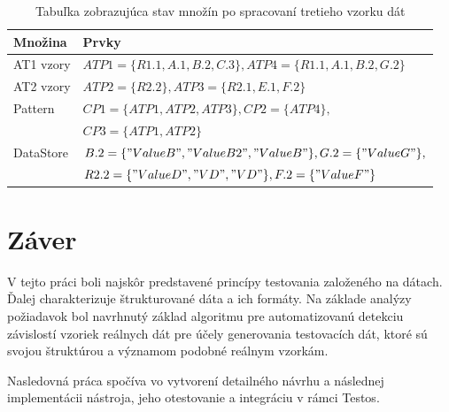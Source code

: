 \begin{table}[hbt]
	\centering
	\label{alg_example3_tab}
	\begin{tabular}{|p{1.8cm}|p{12cm}|}
		\hline
		\textbf{Množina} & \textbf{Prvky} \\ \hline
		AT1 vzory & 	\(ATP1 = \{R1.1, A.1, B.2, C.3\}, ATP4 = \{R1.1, A.1, B.2, G.2\}\)   \\ \hline
		AT2 vzory & 	\(ATP2 = \{R2.2\}, ATP3 = \{R2.1, E.1, F.2 \}  \)   \\ \hline		
		Pattern &\(CP1 = \{ATP1, ATP2, ATP3\}, CP2 = \{ATP4\},\)\\ 
		& \(CP3 = \{ATP1, ATP2\}  \)\\ \hline
		DataStore & 	\(B.2 = \{"ValueB", "ValueB2", "ValueB"\}, G.2 = \{"ValueG"\},\)\\
		&  \(R2.2 = \{"ValueD", "VD", "VD"\}, F.2 = \{"ValueF"\}  \)   \\ \hline								
		
	\end{tabular}
	\caption{Tabuľka zobrazujúca stav množín po spracovaní tretieho vzorku dát}
\end{table} 
  
\chapter{Záver}
\label{zaver}

V tejto práci boli najskôr predstavené princípy testovania založeného na dátach. Ďalej charakterizuje štrukturované dáta a ich formáty. Na základe analýzy požiadavok bol navrhnutý základ algoritmu pre automatizovanú detekciu závislostí vzoriek reálnych dát pre účely generovania testovacích dát, ktoré sú svojou štruktúrou a významom podobné reálnym vzorkám.  

Nasledovná práca spočíva vo vytvorení detailného návrhu a následnej implementácii nástroja, jeho otestovanie a integráciu v rámci Testos. 



